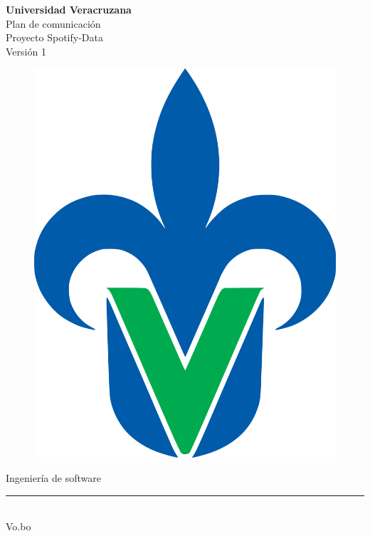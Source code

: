 \begin{titlepage}
	\begin{center}
	{\huge \textbf{Universidad Veracruzana}}\\
	\vspace{2cm}  
	{\Large {Plan de comunicación}}\\
	\vspace{5mm}	
	{\Large {Proyecto Spotify-Data}}\\
	\vspace{5mm}	
	{\Large {Versión 1}}\\
	\vspace{1cm}	
	\begin{figure}[h]
		\centering
		\includegraphics[scale=0.10]{uvlogo}
	\end{figure}
	{\Large {Ingeniería de software}}\\
	\vspace{2cm}	
    \rule{8cm}{0.5mm} \\ \Large Vo.bo\\ 
	\end{center}
\end{titlepage}